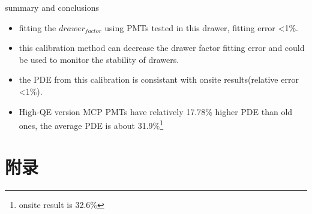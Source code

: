 \documentclass[11pt,compress,xcolor=x11names,UTF8]{beamer}
\begin{document}
\begin{frame}{summary and conclusions}
\begin{itemize}
\item fitting the $drawer_{factor}$ using PMTs tested in this drawer, fitting error <1\%.
\item this calibration method can decrease the drawer factor fitting error and could be used to monitor the stability of drawers.
\item the PDE from this calibration is consistant with onsite results(relative error <1\%).
\item High-QE version MCP PMTs have relatively 17.78\% higher PDE than old ones, the average PDE is about 31.9\%\footnote{onsite result is 32.6\%}
\end{itemize}
\end{frame}

\begin{frame}
\end{frame}

\begin{frame}
\end{frame}

%
%

\appendix

\section*{附录}
\end{document}
